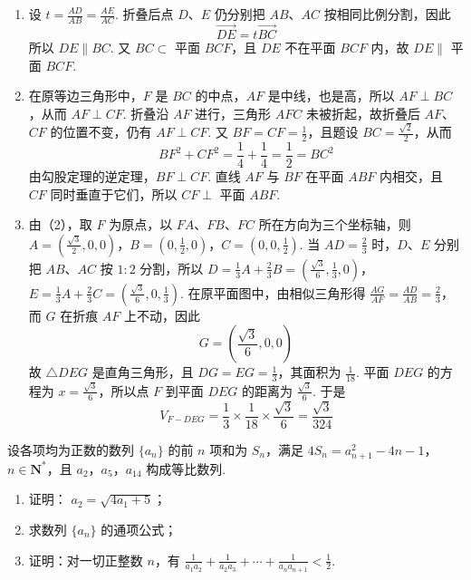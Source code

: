\begin{solution}
\begin{enumerate}
\item
设 \(t=\frac{AD}{AB}=\frac{AE}{AC}\). 折叠后点 \(D\)、\(E\) 仍分别把 \(AB\)、\(AC\) 按相同比例分割，因此
\[
\overrightarrow{DE}=t\overrightarrow{BC}
\]
所以 \(DE\parallel BC\). 又 \(BC\subset\) 平面 \(BCF\)，且 \(DE\) 不在平面 \(BCF\) 内，故 \(DE\parallel\) 平面 \(BCF\).

\item
在原等边三角形中，\(F\) 是 \(BC\) 的中点，\(AF\) 是中线，也是高，所以 \(AF\perp BC\)，从而 \(AF\perp CF\). 折叠沿 \(AF\) 进行，三角形 \(AFC\) 未被折起，故折叠后 \(AF\)、\(CF\) 的位置不变，仍有 \(AF\perp CF\). 又 \(BF=CF=\frac12\)，且题设 \(BC=\frac{\sqrt2}{2}\)，从而
\[
BF^2+CF^2=\frac14+\frac14=\frac12=BC^2
\]
由勾股定理的逆定理，\(BF\perp CF\). 直线 \(AF\) 与 \(BF\) 在平面 \(ABF\) 内相交，且 \(CF\) 同时垂直于它们，所以 \(CF\perp\) 平面 \(ABF\).

\item
由（2），取 \(F\) 为原点，以 \(FA\)、\(FB\)、\(FC\) 所在方向为三个坐标轴，则
\(A=\left(\frac{\sqrt3}{2},0,0\right)\)，\(B=\left(0,\frac12,0\right)\)，\(C=\left(0,0,\frac12\right)\).
当 \(AD=\frac23\) 时，\(D\)、\(E\) 分别把 \(AB\)、\(AC\) 按 \(1:2\) 分割，所以
\(D=\frac13A+\frac23B=\left(\frac{\sqrt3}{6},\frac13,0\right)\)，\(E=\frac13A+\frac23C=\left(\frac{\sqrt3}{6},0,\frac13\right)\).
在原平面图中，由相似三角形得 \(\frac{AG}{AF}=\frac{AD}{AB}=\frac23\)，而 \(G\) 在折痕 \(AF\) 上不动，因此
\[
G=\left(\frac{\sqrt3}{6},0,0\right)
\]
故 \(\triangle DEG\) 是直角三角形，且 \(DG=EG=\frac13\)，其面积为 \(\frac1{18}\). 平面 \(DEG\) 的方程为 \(x=\frac{\sqrt3}{6}\)，所以点 \(F\) 到平面 \(DEG\) 的距离为 \(\frac{\sqrt3}{6}\). 于是
\[
V_{F-DEG}=\frac13\times\frac1{18}\times\frac{\sqrt3}{6}=\frac{\sqrt3}{324}
\]
\end{enumerate}
\end{solution}

\begin{problem}
设各项均为正数的数列 \(\{a_{n}\}\) 的前 \(n\) 项和为 \(S_{n}\)，满足 \(4S_{n} = a_{n+1}^{2} - 4n - 1\)，\(n \in \mathbf{N}^{*}\)，且 \(a_{2}\)，\(a_{5}\)，\(a_{14}\) 构成等比数列.
\begin{enumerate}
\item 证明： \(a_{2} = \sqrt{4a_{1} + 5}\)；
\item 求数列 \(\{a_n\}\) 的通项公式；
\item 证明：对一切正整数 \(n\)，有 \(\frac{1}{a_1 a_2} + \frac{1}{a_2 a_3} + \cdots + \frac{1}{a_n a_{n+1}} < \frac{1}{2}\).
\end{enumerate}
\end{problem}

